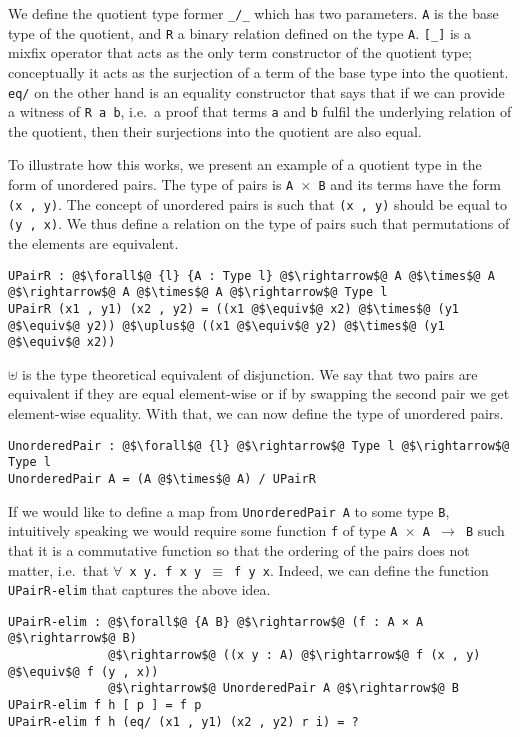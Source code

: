 \documentclass[12pt,twoside,maitrise]{dms}
\theoremstyle{definition}
\numberwithin{equation}{section}
\numberwithin{table}{chapter}
\numberwithin{figure}{chapter}
\newcommand\id[1] {\texttt{#1}}
\newcommand\fn[1] {\texttt{#1}}
\begin{document}
We define the quotient type former \fn{\_/\_} which has two parameters. \id{A}
is the base type of the quotient, and \id{R} a binary relation defined on the
type \id{A}. \fn{[\_]} is a mixfix operator that acts as the only term
constructor of the quotient type; conceptually it acts as the surjection of a
term of the base type into the quotient. \fn{eq/} on the other hand is an
equality constructor that says that if we can provide a witness of \fn{R a b},
i.e.\ a proof that terms \id{a} and \id{b} fulfil the underlying relation of the
quotient, then their surjections into the quotient are also equal.

To illustrate how this works, we present an example of a quotient type in the
form of unordered pairs. The type of pairs is \fn{A $\times$ B} and its terms
have the form \fn{(x , y)}. The concept of unordered pairs is such that \fn{(x ,
  y)} should be equal to \fn{(y , x)}. We thus define a relation on the type of
pairs such that permutations of the elements are equivalent.

\begin{verbatim}
UPairR : @$\forall$@ {l} {A : Type l} @$\rightarrow$@ A @$\times$@ A @$\rightarrow$@ A @$\times$@ A @$\rightarrow$@ Type l
UPairR (x1 , y1) (x2 , y2) = ((x1 @$\equiv$@ x2) @$\times$@ (y1 @$\equiv$@ y2)) @$\uplus$@ ((x1 @$\equiv$@ y2) @$\times$@ (y1 @$\equiv$@ x2))
\end{verbatim}

$\uplus$ is the type theoretical equivalent of disjunction. We say that two
pairs are equivalent if they are equal element-wise or if by swapping the second
pair we get element-wise equality. With that, we can now define the type of
unordered pairs.

\begin{verbatim}
UnorderedPair : @$\forall$@ {l} @$\rightarrow$@ Type l @$\rightarrow$@ Type l
UnorderedPair A = (A @$\times$@ A) / UPairR
\end{verbatim}

If we would like to define a map from \fn{UnorderedPair A} to some type \id{B},
intuitively speaking we would require some function \id{f} of type \fn{A
  $\times$ A $\rightarrow$ B} such that it is a commutative function so that the
ordering of the pairs does not matter, i.e.\ that \fn{$\forall$ x y. f x y
  $\equiv$ f y x}. Indeed, we can define the function \id{UPairR-elim} that
captures the above idea.

\begin{verbatim}
UPairR-elim : @$\forall$@ {A B} @$\rightarrow$@ (f : A × A @$\rightarrow$@ B)
              @$\rightarrow$@ ((x y : A) @$\rightarrow$@ f (x , y) @$\equiv$@ f (y , x))
              @$\rightarrow$@ UnorderedPair A @$\rightarrow$@ B
UPairR-elim f h [ p ] = f p
UPairR-elim f h (eq/ (x1 , y1) (x2 , y2) r i) = ?
\end{verbatim}
\end{document}
